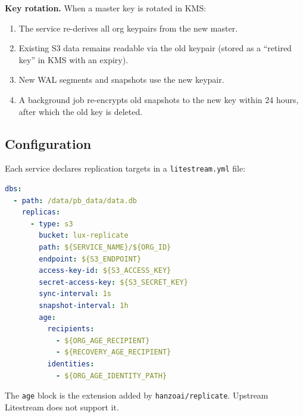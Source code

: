 \noindent\textbf{Key rotation.} When a master key is rotated in KMS:

\begin{enumerate}[nosep]
  \item The service re-derives all org keypairs from the new master.
  \item Existing S3 data remains readable via the old keypair (stored
    as a ``retired key'' in KMS with an expiry).
  \item New WAL segments and snapshots use the new keypair.
  \item A background job re-encrypts old snapshots to the new key
    within 24 hours, after which the old key is deleted.
\end{enumerate}

\subsection{Configuration}\label{sec:config}

Each service declares replication targets in a \texttt{litestream.yml}
file:

\begin{lstlisting}[language=YAML,caption={Minimal litestream.yml for a Base service.}]
dbs:
  - path: /data/pb_data/data.db
    replicas:
      - type: s3
        bucket: lux-replicate
        path: ${SERVICE_NAME}/${ORG_ID}
        endpoint: ${S3_ENDPOINT}
        access-key-id: ${S3_ACCESS_KEY}
        secret-access-key: ${S3_SECRET_KEY}
        sync-interval: 1s
        snapshot-interval: 1h
        age:
          recipients:
            - ${ORG_AGE_RECIPIENT}
            - ${RECOVERY_AGE_RECIPIENT}
          identities:
            - ${ORG_AGE_IDENTITY_PATH}
\end{lstlisting}

The \texttt{age} block is the extension added by
\texttt{hanzoai/replicate}. Upstream Litestream does not support it.


